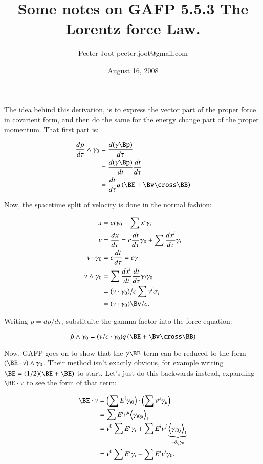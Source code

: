 \documentclass{article}
\title{ Some notes on GAFP 5.5.3 The Lorentz force Law.}
\author{Peeter Joot \quad peeter.joot@gmail.com}
\date{August 16, 2008}
\newcommand{\gpgrade}[2] {{\left\langle{{#1}}\right\rangle}_{#2}}
\newcommand{\gpgradeone}[1] {\gpgrade{#1}{1}}
\begin{document}
\maketitle{}

\section{}

The idea behind this derivation, is to express the vector part of the proper force in covarient form, and then
do the same for the energy change part of the proper momentum.  That first part is:

\begin{align*}
\frac{dp}{d\tau} \wedge \gamma_0
&= \frac{d (\gamma \Bp)}{d\tau} \\
&= \frac{d (\gamma \Bp)}{dt} \frac{dt}{d\tau} \\
&= \frac{dt}{d\tau} q \left( \BE + \Bv \cross \BB \right)
\end{align*}

Now, the spacetime split of velocity is done in the normal fashion:

\begin{align*}
x &= c t \gamma_0 + \sum x^i \gamma_i \\
v &= \frac{dx}{d\tau} = c \frac{dt}{d\tau} \gamma_0 + \sum \frac{dx^i}{d\tau} \gamma_i \\
v \cdot \gamma_0 &= c \frac{dt}{d\tau} = c \gamma \\
v \wedge \gamma_0
&= \sum \frac{dx^i}{dt} \frac{dt}{d\tau} \gamma_i \gamma_0 \\
&= (v \cdot \gamma_0)/c \sum v^i \sigma_i \\
&= (v \cdot \gamma_0) \Bv/c.
\end{align*}

Writing $\dot{p} = dp/d\tau$, substituite the gamma factor into the force equation:

\begin{equation*}
\dot{p} \wedge \gamma_0 = ( v/c \cdot \gamma_0 ) q \left( \BE + \Bv \cross \BB \right)
\end{equation*}

Now, GAFP goes on to show that the $\gamma \BE$ term can be reduced to the form $(\BE \cdot v) \wedge \gamma_0$.  Their
method isn't exactly obvious, for example writing $\BE = (1/2)(\BE + \BE)$ to start.  Let's just do this backwards
instead, expanding $\BE \cdot v$ to see the form of that term:

\begin{align*}
\BE \cdot v
&= \left(\sum E^i \gamma_{i0}\right) \cdot \left( \sum v^{\mu} \gamma_{\mu}\right) \\
&= \sum E^i v^{\mu} \gpgradeone{ \gamma_{i0\mu}} \\
&= v^0 \sum E^i \gamma_{i} + \sum E^i v^{j} \underbrace{\gpgradeone{ \gamma_{i0j}}}_{-\delta_{ij} \gamma_0} \\
&= v^0 \sum E^i \gamma_i - \sum E^i v^i \gamma_0.
\end{align*}
\end{document}
